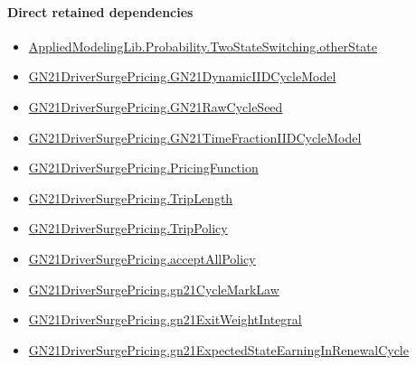 \documentclass[10pt]{article}
\begin{document}
\paragraph{Direct retained dependencies}
\begin{itemize}\raggedright
\item \hyperlink{governing-declaration-befc3a82e4090595}{Applied\allowbreak{}Modeling\allowbreak{}Lib.\allowbreak{}Probability.\allowbreak{}Two\allowbreak{}State\allowbreak{}Switching.\allowbreak{}other\allowbreak{}State}
\item \hyperlink{paper-prerequisite-470400593141b2a3}{GN21\allowbreak{}Driver\allowbreak{}Surge\allowbreak{}Pricing.\allowbreak{}GN21\allowbreak{}Dynamic\allowbreak{}IID\allowbreak{}Cycle\allowbreak{}Model}
\item \hyperlink{governing-declaration-228de34d5811f602}{GN21\allowbreak{}Driver\allowbreak{}Surge\allowbreak{}Pricing.\allowbreak{}GN21\allowbreak{}Raw\allowbreak{}Cycle\allowbreak{}Seed}
\item \hyperlink{paper-prerequisite-be12410503a9b0bd}{GN21\allowbreak{}Driver\allowbreak{}Surge\allowbreak{}Pricing.\allowbreak{}GN21\allowbreak{}Time\allowbreak{}Fraction\allowbreak{}IID\allowbreak{}Cycle\allowbreak{}Model}
\item \hyperlink{governing-declaration-9ab0ab344da5df05}{GN21\allowbreak{}Driver\allowbreak{}Surge\allowbreak{}Pricing.\allowbreak{}Pricing\allowbreak{}Function}
\item \hyperlink{governing-declaration-a616c143f22cf2bc}{GN21\allowbreak{}Driver\allowbreak{}Surge\allowbreak{}Pricing.\allowbreak{}Trip\allowbreak{}Length}
\item \hyperlink{governing-declaration-4312ad4cb899871f}{GN21\allowbreak{}Driver\allowbreak{}Surge\allowbreak{}Pricing.\allowbreak{}Trip\allowbreak{}Policy}
\item \hyperlink{governing-declaration-e94c9281d4f4b12d}{GN21\allowbreak{}Driver\allowbreak{}Surge\allowbreak{}Pricing.\allowbreak{}accept\allowbreak{}All\allowbreak{}Policy}
\item \hyperlink{governing-declaration-efacc1fa91256093}{GN21\allowbreak{}Driver\allowbreak{}Surge\allowbreak{}Pricing.\allowbreak{}gn21\allowbreak{}Cycle\allowbreak{}Mark\allowbreak{}Law}
\item \hyperlink{governing-declaration-14f0a8679c69b067}{GN21\allowbreak{}Driver\allowbreak{}Surge\allowbreak{}Pricing.\allowbreak{}gn21\allowbreak{}Exit\allowbreak{}Weight\allowbreak{}Integral}
\item \hyperlink{governing-declaration-6247f5a4d65e34a2}{GN21\allowbreak{}Driver\allowbreak{}Surge\allowbreak{}Pricing.\allowbreak{}gn21\allowbreak{}Expected\allowbreak{}State\allowbreak{}Earning\allowbreak{}In\allowbreak{}Renewal\allowbreak{}Cycle}

\end{itemize}
\end{document}
